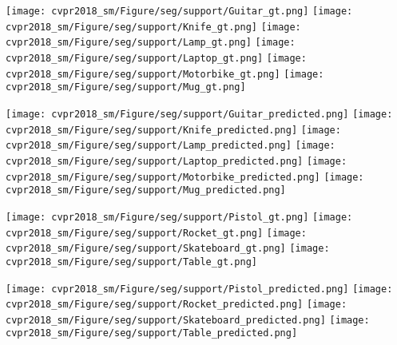\documentclass[10pt,twocolumn,letterpaper]{article}
\begin{document}
\begin{figure*}[t]
        \vspace{15pt}
        
        \texttt{[image: cvpr2018\_sm/Figure/seg/support/Guitar\_gt.png]} \hspace{10pt}
        \texttt{[image: cvpr2018\_sm/Figure/seg/support/Knife\_gt.png]} \hspace{10pt}
        \texttt{[image: cvpr2018\_sm/Figure/seg/support/Lamp\_gt.png]} \hspace{10pt}
        \texttt{[image: cvpr2018\_sm/Figure/seg/support/Laptop\_gt.png]} \hspace{10pt}
        \texttt{[image: cvpr2018\_sm/Figure/seg/support/Motorbike\_gt.png]} \hspace{10pt}
        \texttt{[image: cvpr2018\_sm/Figure/seg/support/Mug\_gt.png]}
        
        \texttt{[image: cvpr2018\_sm/Figure/seg/support/Guitar\_predicted.png]} \hspace{10pt}
        \texttt{[image: cvpr2018\_sm/Figure/seg/support/Knife\_predicted.png]} \hspace{10pt}
        \texttt{[image: cvpr2018\_sm/Figure/seg/support/Lamp\_predicted.png]} \hspace{10pt}
        \texttt{[image: cvpr2018\_sm/Figure/seg/support/Laptop\_predicted.png]} \hspace{10pt}
        \texttt{[image: cvpr2018\_sm/Figure/seg/support/Motorbike\_predicted.png]} \hspace{10pt}
        \texttt{[image: cvpr2018\_sm/Figure/seg/support/Mug\_predicted.png]}
        
        \vspace{15pt}
        
        \texttt{[image: cvpr2018\_sm/Figure/seg/support/Pistol\_gt.png]} \hspace{10pt}
        \texttt{[image: cvpr2018\_sm/Figure/seg/support/Rocket\_gt.png]} \hspace{10pt}
        \texttt{[image: cvpr2018\_sm/Figure/seg/support/Skateboard\_gt.png]} \hspace{10pt}
        \texttt{[image: cvpr2018\_sm/Figure/seg/support/Table\_gt.png]}
    
        \texttt{[image: cvpr2018\_sm/Figure/seg/support/Pistol\_predicted.png]} \hspace{10pt}
        \texttt{[image: cvpr2018\_sm/Figure/seg/support/Rocket\_predicted.png]} \hspace{10pt}
        \texttt{[image: cvpr2018\_sm/Figure/seg/support/Skateboard\_predicted.png]} \hspace{10pt}
        \texttt{[image: cvpr2018\_sm/Figure/seg/support/Table\_predicted.png]}
        

\end{figure*}
\end{document}
